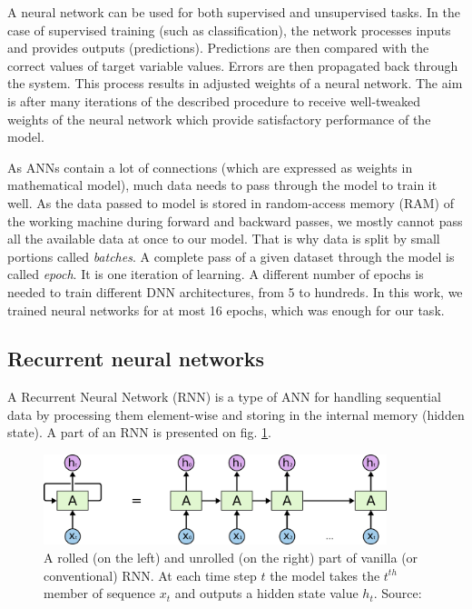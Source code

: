 A neural network can be used for both supervised and unsupervised tasks. In the case of supervised training (such as classification), the network processes inputs and provides outputs (predictions). Predictions are then compared with the correct values of target variable values. Errors are then propagated back through the system. This process results in adjusted weights of a neural network. The aim is after many iterations of the described procedure to receive well-tweaked weights of the neural network which provide satisfactory performance of the model. 

As ANNs contain a lot of connections (which are expressed as weights in mathematical model), much data needs to pass through the model to train it well. As the data passed to model is stored in random-access memory (RAM) of the working machine during forward and backward passes, we mostly cannot pass all the available data at once to our model. That is why data is split by small portions called \textit{batches}. A complete pass of a given dataset through the model is called \textit{epoch}. It is one iteration of learning. A different number of epochs is needed to train different DNN architectures, from 5 to hundreds. In this work, we trained neural networks for at most 16 epochs, which was enough for our task.

\subsection{Recurrent neural networks}
\label{sec:rnn}
A Recurrent Neural Network (RNN) is a type of ANN for handling sequential data by processing them element-wise and storing in the internal memory (hidden state). A part of an RNN is presented on fig. \ref{fig:rnn}.

\begin{figure}[h]
    \centering
    \includegraphics[width=10cm]{Images/RNN-unrolled.png}
    \caption{A rolled (on the left) and unrolled (on the right) part of vanilla (or conventional) RNN. At each time step $t$ the model takes the $t^{th}$ member of sequence $x_t$ and outputs a hidden state value $h_t$. Source: \citep{Olah-2015}}
    \label{fig:rnn}
\end{figure} 

